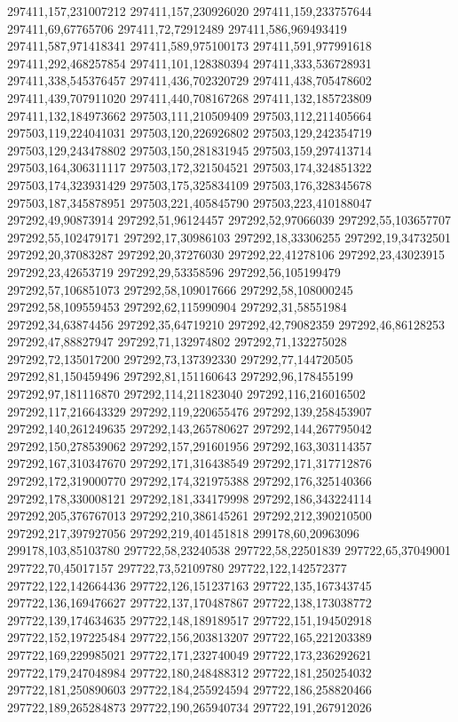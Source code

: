 297411,157,231007212
297411,157,230926020
297411,159,233757644
297411,69,67765706
297411,72,72912489
297411,586,969493419
297411,587,971418341
297411,589,975100173
297411,591,977991618
297411,292,468257854
297411,101,128380394
297411,333,536728931
297411,338,545376457
297411,436,702320729
297411,438,705478602
297411,439,707911020
297411,440,708167268
297411,132,185723809
297411,132,184973662
297503,111,210509409
297503,112,211405664
297503,119,224041031
297503,120,226926802
297503,129,242354719
297503,129,243478802
297503,150,281831945
297503,159,297413714
297503,164,306311117
297503,172,321504521
297503,174,324851322
297503,174,323931429
297503,175,325834109
297503,176,328345678
297503,187,345878951
297503,221,405845790
297503,223,410188047
297292,49,90873914
297292,51,96124457
297292,52,97066039
297292,55,103657707
297292,55,102479171
297292,17,30986103
297292,18,33306255
297292,19,34732501
297292,20,37083287
297292,20,37276030
297292,22,41278106
297292,23,43023915
297292,23,42653719
297292,29,53358596
297292,56,105199479
297292,57,106851073
297292,58,109017666
297292,58,108000245
297292,58,109559453
297292,62,115990904
297292,31,58551984
297292,34,63874456
297292,35,64719210
297292,42,79082359
297292,46,86128253
297292,47,88827947
297292,71,132974802
297292,71,132275028
297292,72,135017200
297292,73,137392330
297292,77,144720505
297292,81,150459496
297292,81,151160643
297292,96,178455199
297292,97,181116870
297292,114,211823040
297292,116,216016502
297292,117,216643329
297292,119,220655476
297292,139,258453907
297292,140,261249635
297292,143,265780627
297292,144,267795042
297292,150,278539062
297292,157,291601956
297292,163,303114357
297292,167,310347670
297292,171,316438549
297292,171,317712876
297292,172,319000770
297292,174,321975388
297292,176,325140366
297292,178,330008121
297292,181,334179998
297292,186,343224114
297292,205,376767013
297292,210,386145261
297292,212,390210500
297292,217,397927056
297292,219,401451818
299178,60,20963096
299178,103,85103780
297722,58,23240538
297722,58,22501839
297722,65,37049001
297722,70,45017157
297722,73,52109780
297722,122,142572377
297722,122,142664436
297722,126,151237163
297722,135,167343745
297722,136,169476627
297722,137,170487867
297722,138,173038772
297722,139,174634635
297722,148,189189517
297722,151,194502918
297722,152,197225484
297722,156,203813207
297722,165,221203389
297722,169,229985021
297722,171,232740049
297722,173,236292621
297722,179,247048984
297722,180,248488312
297722,181,250254032
297722,181,250890603
297722,184,255924594
297722,186,258820466
297722,189,265284873
297722,190,265940734
297722,191,267912026
